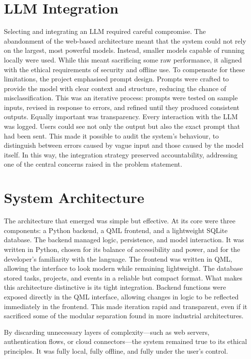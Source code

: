 \documentclass{report}
\begin{document}
\section{LLM Integration}

Selecting and integrating an LLM required careful compromise. The abandonment of the web-based architecture meant that the system could not rely on the largest, most powerful models. Instead, smaller models capable of running locally were used. While this meant sacrificing some raw performance, it aligned with the ethical requirements of security and offline use.
To compensate for these limitations, the project emphasised prompt design. Prompts were crafted to provide the model with clear context and structure, reducing the chance of misclassification. This was an iterative process: prompts were tested on sample inputs, revised in response to errors, and refined until they produced consistent outputs.
Equally important was transparency. Every interaction with the LLM was logged. Users could see not only the output but also the exact prompt that had been sent. This made it possible to audit the system's behaviour, to distinguish between errors caused by vague input and those caused by the model itself. In this way, the integration strategy preserved accountability, addressing one of the central concerns raised in the problem statement.

\section{System Architecture}

The architecture that emerged was simple but effective. At its core were three components: a Python backend, a QML frontend, and a lightweight SQLite database.
The backend managed logic, persistence, and model interaction. It was written in Python, chosen for its balance of accessibility and power, and for the developer's familiarity with the language. The frontend was written in QML, allowing the interface to look modern while remaining lightweight. The database stored tasks, projects, and events in a reliable but compact format.
What makes this architecture distinctive is its tight integration. Backend functions were exposed directly in the QML interface, allowing changes in logic to be reflected immediately in the frontend. This made iteration rapid and transparent, even if it sacrificed some of the modular separation found in more industrial architectures.

By discarding unnecessary layers of complexity—such as web servers, authentication flows, or cloud connectors—the system remained true to its ethical principles. It was fully local, fully offline, and fully under the user's control.
\end{document}
